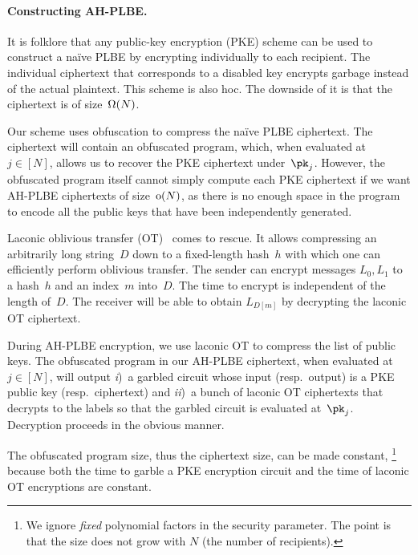\paragraph{Constructing AH-PLBE.}
It is folklore that any public-key encryption (PKE) scheme can be used to construct a na{\"i}ve PLBE by encrypting individually to each recipient.
The individual ciphertext that corresponds to a disabled key encrypts garbage instead of the actual plaintext.
This scheme is also \ad hoc.
The downside of it is that the ciphertext is of size~$\operatorname{\Omega}(N)$.

Our scheme uses obfuscation to compress the na{\"i}ve PLBE ciphertext.
The ciphertext will contain an obfuscated program, which, when evaluated at~${j\in[N]}$, allows us to recover the PKE ciphertext under~$\pk_j$.
However, the obfuscated program itself cannot simply compute each PKE ciphertext if we want AH-PLBE ciphertexts of size~$\operatorname{o}(N)$, as there is no enough space in the program to encode all the public keys that have been independently generated.

Laconic oblivious transfer (OT)~\cite{C:CDGGMP17} comes to rescue.
It allows compressing an arbitrarily long string~$D$ down to a fixed-length hash~$h$ with which one can efficiently perform oblivious transfer.
The sender can encrypt messages $L_0,L_1$ to a hash~$h$ and an index~$m$ into~$D$.
The time to encrypt is independent of the length of~$D$.
The receiver will be able to obtain $L_{D[m]}$ by decrypting the laconic OT ciphertext.

During AH-PLBE encryption, we use laconic OT to compress the list of public keys.
The obfuscated program in our AH-PLBE ciphertext, when evaluated at~${j\in[N]}$, will output
\emph{i})~a garbled circuit whose input (resp.~output) is a PKE public key (resp.~ciphertext) and
\emph{ii})~a bunch of laconic OT ciphertexts that decrypts to the labels so that the garbled circuit is evaluated at~$\pk_j$.
Decryption proceeds in the obvious manner.

The obfuscated program size, thus the ciphertext size, can be made constant,%
\footnote{We ignore \emph{fixed} polynomial factors in the security parameter.
The point is that the size does not grow with $N$ (the number of recipients).}%
\WideNarrow{\pagebreak[3]}{}
because
both the time to garble a PKE encryption circuit and the time of laconic OT encryptions are constant.
